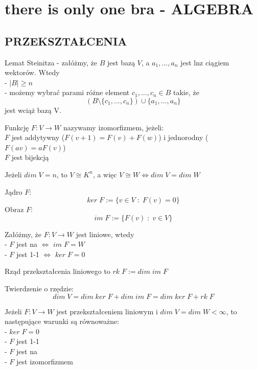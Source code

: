 \documentclass{article}
\begin{document}
\section*{there is only one bra - ALGEBRA}
\begin{multicols*}{2}

    \subsection*{PRZEKSZTAŁCENIA}

    {\color{def}Lemat Steinitza} - załóżmy, że $B$ jest bazą $V$, a $a_1, ..., a_n$ jest lnz ciągiem wektorów. Wtedy\smallskip\\
    \indent - $|B|\geq n$\\
    \indent - możemy wybrać parami różne element $c_1, ..., c_n\in B$ takie, że
    $$(B\setminus\{c_1, ..., c_n\})\cup\{a_1,..., a_n\}$$
    jest wciąż bazą V.
    

    Funkcję $F:V\to W$ nazywamy {\color{def}izomorfizmem}, jeżeli:\smallskip\\
    \indent $F$ jest addytywny ($F(v+1)=F(v)+F(w)$) i jednorodny ($F(av)=aF(v)$)\\
    \indent $F$ jest bijekcją\bigskip

    Jeżeli $dim \;V=n$, to $V\cong K^n$, a więc $V\cong W\iff dim \;V= dim \;W$


    {\color{def}Jądro $F$:}
    $$ker\;F:=\{v\in V\;:\;F(v)=0\}$$
    {\color{def}Obraz $F$:}
    $$im\;F:=\{F(v)\;:\;v\in V\}$$

    Załóżmy, że $F:V\to W$ jest liniowe, wtedy\smallskip\\
    \indent - $F$ jest na $\iff$ $im\;F=W$\\
    \indent - $F$ jest 1-1 $\iff$ $ker\;F=0$

    {\color{def}Rząd} przekształcenia liniowego to $rk\;F:=dim\;im\;F$\bigskip

    {\color{title-color}Twierdzenie o rzędzie:}
    $$dim \;V=dim\;ker\;F+dim\;im\;F=dim\;ker\;F+rk\;F$$


    Jeżeli $F:V\to W$ jest przekształceniem liniowym i $dim\;V=dim\;W<\infty$, to następujące warunki są równoważne:\smallskip\\
    \indent - $ker\;F=0$\\
    \indent - $F$ jest 1-1\\
    \indent - $F$ jest na\\
    \indent - $F$ jest izomorfizmem\bigskip


\end{multicols*}
\end{document}
